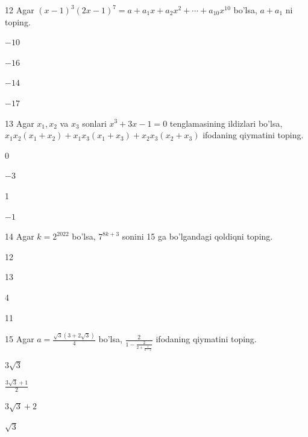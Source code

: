 \documentclass[14pt]{article}
\begin{document}
\begin{questionbox}{12}
    Agar $(x - 1)^3(2x - 1)^7 = a + a_1x + a_2x^2 + \cdots + a_{10}x^{10}$ bo'lsa, $a + a_1$ ni toping.
    \begin{options}
        \item $-10$
        \item $-16$
        \item $-14$
        \item $-17$
    \end{options}
\end{questionbox}

\begin{questionbox}{13}
    Agar \( x_1, x_2 \) va \( x_3 \) sonlari \( x^3 + 3x - 1 = 0 \) tenglamasining ildizlari bo'lsa, \( x_1x_2(x_1 + x_2) + x_1x_3(x_1 + x_3) + x_2x_3(x_2 + x_3) \) ifodaning qiymatini toping.
    \begin{options}
        \item 0
        \item $-3$
        \item 1
        \item $-1$
    \end{options}
\end{questionbox}

\begin{questionbox}{14}
    Agar \( k = 2^{2022} \) bo'lsa, \( 7^{8k+3} \) sonini 15 ga bo'lgandagi qoldiqni toping.
    \begin{options}
        \item 12
        \item 13
        \item 4
        \item 11
    \end{options}
\end{questionbox}

\begin{questionbox}{15}
    Agar \( a = \frac{\sqrt{3}(3+2\sqrt{3})}{4} \) bo'lsa, \( \frac{2}{1-\frac{2}{2+\frac{1}{a-2}}} \) ifodaning qiymatini toping.
    \begin{options}
        \item \(3\sqrt{3}\)
        \item \(\frac{3\sqrt{3}+1}{2}\)
        \item \(3\sqrt{3} + 2\)
        \item \(\sqrt{3}\)
    \end{options}
\end{questionbox}
\end{document}
